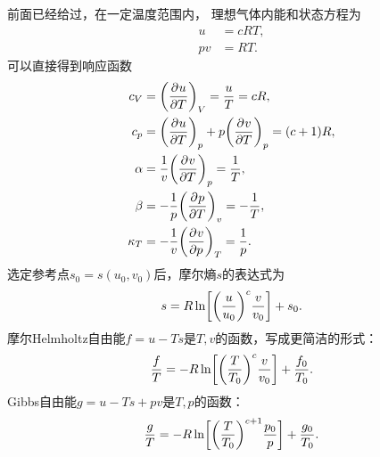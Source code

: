 前面已经给过，在一定温度范围内，
理想气体内能和状态方程为
\begin{subequations}
	\begin{align}
		u&=cRT,\\
		pv&=RT.
	\end{align}
\end{subequations}
可以直接得到响应函数
\begin{subequations}
	\begin{align}
		c_V&=\pu[V]uT=\frac uT=cR,\\
		c_p&=\pu[p]uT+p\pu[p]vT=(c+1)R,\\
		\alpha&=\frac1v\pu[p]vT=\frac1T,\\
		\beta&=-\frac1p\pu[v]pT=-\frac1T,\\
		\kappa_T&=-\frac1v\pu[T]vp=\frac1p.
	\end{align}
\end{subequations}
选定参考点$s_0=s(u_0,v_0)$后，摩尔熵$s$的表达式为
\begin{equation}
	s=R\ln\biggfkh{\biggkh{\frac u{u_0}}^c\frac v{v_0}}+s_0.
\end{equation}
摩尔Helmholtz自由能$f=u-Ts$是$T,v$的函数，写成更简洁的形式：
\begin{equation}
	\frac fT=-R\ln\biggfkh{\biggkh{\frac T{T_0}}^c\frac v{v_0}}+\frac{f_0}{T_0}.
\end{equation}
Gibbs自由能$g=u-Ts+pv$是$T,p$的函数：
\begin{equation}
	\frac gT=-R\ln\biggfkh{\biggkh{\frac T{T_0}}^{c+1}\frac{p_0}p}+\frac{g_0}{T_0}.
\end{equation}


